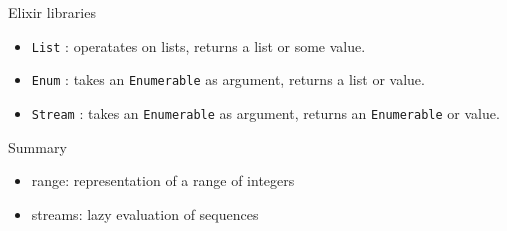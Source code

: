 \begin{frame}{Elixir libraries}

  \begin{itemize}
  \item {\tt List} : operatates on lists, returns a list or some value.  \pause
  \item {\tt Enum} : takes an {\tt Enumerable} as argument, returns a list or value. \pause
  \item {\tt Stream} : takes an {\tt Enumerable} as argument, returns an {\tt Enumerable} or value. 
  \end{itemize}

  \vspace{20pt}
  
\end{frame}

\begin{frame}{Summary}

\begin{itemize}
\pause\item {range}: representation of a range of integers
\pause\item {streams}: lazy evaluation of sequences
\end{itemize}

\end{frame}






